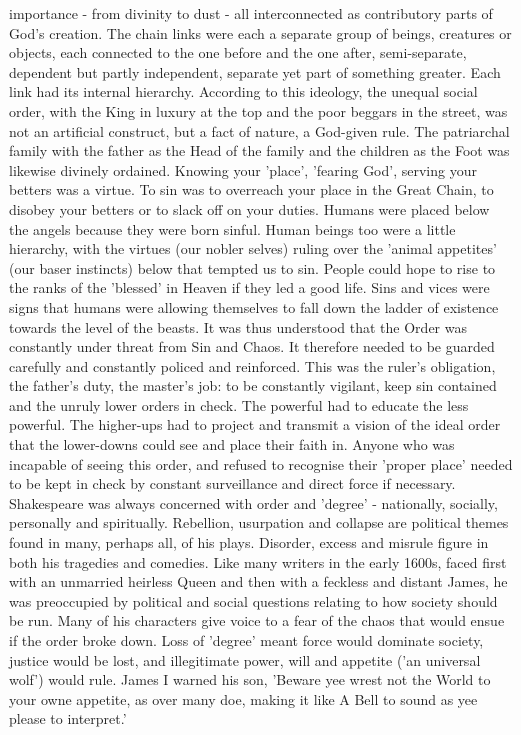 			importance - from divinity to dust - all interconnected as contributory parts of God's creation. The chain links were each a separate group of beings, creatures or objects, each connected to the one before and the one after, semi-separate, dependent but partly independent, separate yet part of something greater. Each link had its internal hierarchy. According to this ideology, the unequal social order, with the King in luxury at the top and the poor beggars in the street, was not an artificial construct, but a fact of nature, a God-given rule. The patriarchal family with the father as the Head of the family and the children as the Foot was likewise divinely ordained. Knowing your 'place', 'fearing God', serving your betters was a virtue. To sin was to overreach your place in the Great Chain, to disobey your betters or to slack off on your duties. Humans were placed below the angels because they were born sinful. Human beings too were a little hierarchy, with the virtues (our nobler selves) ruling over the 'animal appetites' (our baser instincts) below that tempted us to sin. People could hope to rise to the ranks of the 'blessed' in Heaven if they led a good life. Sins and vices were signs that humans were allowing themselves to fall down the ladder of existence towards the level of the beasts. It was thus understood that the Order was constantly under threat from Sin and Chaos. It therefore needed to be guarded carefully and constantly policed and reinforced. This was the ruler's obligation, the father's duty, the master's job: to be constantly vigilant, keep sin contained and the unruly lower orders in check. The powerful had to educate the less powerful. The higher-ups had to project and transmit a vision of the ideal order that the lower-downs could see and place their faith in. Anyone who was incapable of seeing this order, and refused to recognise their 'proper place' needed to be kept in check by constant surveillance and direct force if necessary. Shakespeare was always concerned with order and 'degree' - nationally, socially, personally and spiritually. Rebellion, usurpation and collapse are political themes found in many, perhaps all, of his plays. Disorder, excess and misrule figure in both his tragedies and comedies. Like many writers in the early 1600s, faced first with an unmarried heirless Queen and then with a feckless and distant James, he was preoccupied by political and social questions relating to how society should be run. Many of his characters give voice to a fear of the chaos that would ensue if the order broke down. Loss of 'degree' meant force would dominate society, justice would be lost, and illegitimate power, will and appetite ('an universal wolf') would rule. James I warned his son, 'Beware yee wrest not the World to your owne appetite, as over many doe, making it like A Bell to sound as yee please to interpret.'

